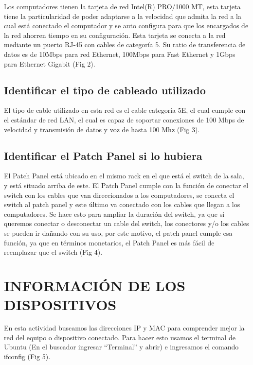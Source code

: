 \documentclass[onecolumn,11pts]{IEEEtran}
\begin{document}
        Los computadores tienen la tarjeta de red Intel(R) PRO/1000 MT, esta tarjeta tiene la particularidad de poder adaptarse a la velocidad que admita la red a la cual está conectado el computador y se auto configura para que los encargados de la red ahorren tiempo en su configuración. Esta tarjeta se conecta a la red mediante un puerto RJ-45 con cables de categoría 5. Su ratio de transferencia de datos es de 10Mbps para red Ethernet, 100Mbps para Fast Ethernet y 1Gbps para Ethernet Gigabit (Fig 2).
        


\subsection{Identificar el tipo de cableado utilizado}

        El tipo de cable utilizado en esta red es el cable categoría 5E, el cual cumple con el estándar de red LAN, el cual es capaz de soportar conexiones de 100 Mbps de velocidad y transmisión de datos y voz de hasta 100 Mhz (Fig 3).

\subsection{Identificar el Patch Panel si lo hubiera}

        El Patch Panel está ubicado en el mismo rack en el que está el switch de la sala, y está situado arriba de este. El Patch Panel cumple con la función de conectar el switch con los cables que van direccionados a los computadores, se conecta el switch al patch panel y este último va conectado con los cables que llegan a los computadores. Se hace esto para ampliar la duración del switch, ya que si queremos conectar o desconectar un cable del switch, los conectores y/o los cables se pueden ir dañando con su uso, por este motivo, el patch panel cumple esa función, ya que en términos monetarios, el Patch Panel es más fácil de reemplazar que el switch (Fig 4).
                

\section{INFORMACIÓN DE LOS DISPOSITIVOS}

        En esta actividad buscamos las direcciones IP y MAC para comprender mejor la red del equipo o dispositivo conectado.
        Para hacer esto usamos el terminal de Ubuntu (En el buscador ingresar “Terminal” y abrir) e ingresamos el comando ifconfig (Fig 5).     
        
\end{document}

